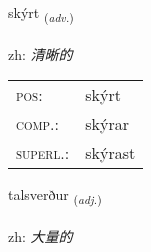 \documentclass[frontgrid, backgrid]{flacards}\usepackage[]{graphicx}\usepackage[]{color}
\begin{document}
\renewcommand{\flhead}{\vskip5pt \fboxsep=0pt {\small\bfseries\footnotesize Atviksorð | 副词}}
\renewcommand{\fcfoot}{\vskip5pt \fboxsep=0pt \hspace{2pt}{\small\bfseries\footnotesize 2K}}

\renewcommand{\blhead}{\vskip5pt {\small\bfseries\footnotesize Atviksorð | 副词 }}
\renewcommand{\bcfoot}{\vskip5pt \hspace{2pt}{\small\bfseries\footnotesize 2K}}


{skýrt \small{\textsubscript{(\textit{adv.})}} \\[1ex] %
\textphonetic{[scir̥t]} \\
zh: \emph{清晰的} \\  [2ex]
\renewcommand*{\arraystretch}{0.8}
\begin{tabular}{ll}
\textsc{pos}: & skýrt \\ 
\textsc{comp.}: & skýrar \\ 
\textsc{superl.}: & skýrast \\
\end{tabular}
}

\renewcommand{\flhead}{\vskip5pt \fboxsep=0pt {\small\bfseries\footnotesize Lýsingarorð | 形容词}}
\renewcommand{\fcfoot}{\vskip5pt \fboxsep=0pt \hspace{2pt}{\small\bfseries\footnotesize 2K}}

\renewcommand{\blhead}{\vskip5pt {\small\bfseries\footnotesize Lýsingarorð | 形容词 }}
\renewcommand{\bcfoot}{\vskip5pt \hspace{2pt}{\small\bfseries\footnotesize 2K}}


{talsverður \small{\textsubscript{(\textit{adj.})}} \\[1ex] %
\textphonetic{[tʰalsvɛrðʏr]} \\
zh: \emph{大量的} \\  [2ex]
\renewcommand*{\arraystretch}{0.8}
}
\end{document}

